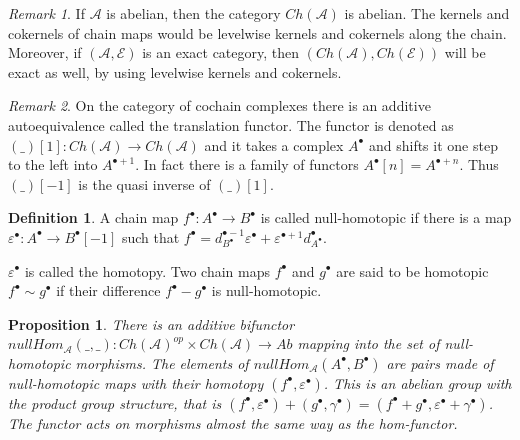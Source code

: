 \documentclass[11pt]{article}
\newtheorem{prop}[theorem]{Proposition}
\theoremstyle{definition}
\newtheorem{definition}{Definition}[section]
\theoremstyle{remark}
\newtheorem*{remark}{Remark}
\newcommand{\chain}[1]{#1^{\bullet}}
\begin{document}
            \begin{remark}
                If $\mathcal{A}$ is abelian, then the category $Ch(\mathcal{A})$ is abelian. The kernels and cokernels of chain maps would be levelwise kernels and cokernels along the chain. Moreover, if $(\mathcal{A},\mathcal{E})$ is an exact category, then $(Ch(\mathcal{A}),Ch(\mathcal{E}))$ will be exact as well, by using levelwise kernels and cokernels.
            \end{remark}

            \begin{remark}
                On the category of cochain complexes there is an additive autoequivalence called the translation functor. The functor is denoted as $(\_)[1]:Ch(\mathcal{A})\rightarrow Ch(\mathcal{A})$ and it takes a complex $A^{\bullet}$ and shifts it one step to the left into $A^{\bullet + 1}$. In fact there is a family of functors $A^{\bullet}[n]=A^{\bullet + n}$. Thus $(\_)[-1]$ is the quasi inverse of $(\_)[1]$.
            \end{remark}

            \begin{definition}
                A chain map $f^{\bullet}:A^{\bullet}\rightarrow B^{\bullet}$ is called null-homotopic if there is a map $\varepsilon^{\bullet}:A^{\bullet}\rightarrow B^{\bullet}[-1]$ such that $f^{\bullet} = d_{B^{\bullet}}^{\bullet - 1}\varepsilon^{\bullet} + \varepsilon^{\bullet + 1}d_{A^{\bullet}}^{\bullet}$.
                \begin{center}
                \end{center}
                $\chain{\varepsilon}$ is called the homotopy. Two chain maps $\chain{f}$ and $\chain{g}$ are said to be homotopic $\chain{f}\sim\chain{g}$ if their difference $\chain{f}-\chain{g}$ is null-homotopic.
            \end{definition}

            \begin{prop}
                There is an additive bifunctor $nullHom_{\mathcal{A}}(\_,\_):Ch(\mathcal{A})^{op}\times Ch(\mathcal{A})\rightarrow Ab$ mapping into the set of null-homotopic morphisms. The elements of $nullHom_{\mathcal{A}}(\chain{A},\chain{B})$ are pairs made of null-homotopic maps with their homotopy $(\chain{f},\chain{\varepsilon})$. This is an abelian group with the product group structure, that is $(\chain{f},\chain{\varepsilon}) + (\chain{g},\chain{\gamma}) = (\chain{f}+\chain{g},\chain{\varepsilon}+\chain{\gamma})$. The functor acts on morphisms almost the same way as the hom-functor.
            \end{prop}
\end{document}
